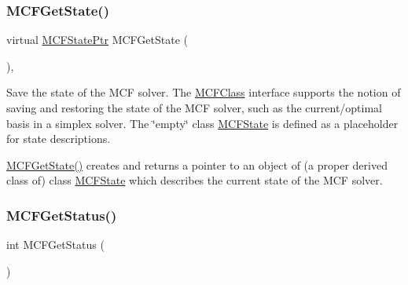 \mbox{\label{class_m_c_f_class_a995a05ecaa6ece4be3afbddbb36b2c4e}} 
\subsubsection{\texorpdfstring{M\+C\+F\+Get\+State()}{MCFGetState()}}
{\footnotesize\ttfamily virtual \mbox{\hyperlink{class_m_c_f_class_ab547218814e3b90d15f219f5aaf8b937}{M\+C\+F\+State\+Ptr}} M\+C\+F\+Get\+State (\begin{DoxyParamCaption}\item[{void}]{ }\end{DoxyParamCaption})\hspace{0.3cm}{\ttfamily [inline]}, {\ttfamily [virtual]}}

Save the state of the M\+CF solver. The \mbox{\hyperlink{class_m_c_f_class}{M\+C\+F\+Class}} interface supports the notion of saving and restoring the state of the M\+CF solver, such as the current/optimal basis in a simplex solver. The \char`\"{}empty\char`\"{} class \mbox{\hyperlink{class_m_c_f_class_1_1_m_c_f_state}{M\+C\+F\+State}} is defined as a placeholder for state descriptions.

\mbox{\hyperlink{class_m_c_f_class_a995a05ecaa6ece4be3afbddbb36b2c4e}{M\+C\+F\+Get\+State()}} creates and returns a pointer to an object of (a proper derived class of) class \mbox{\hyperlink{class_m_c_f_class_1_1_m_c_f_state}{M\+C\+F\+State}} which describes the current state of the M\+CF solver. \mbox{\label{class_m_c_f_class_a333e27ad7a73779b096cb70829cbe8be}} 
\subsubsection{\texorpdfstring{M\+C\+F\+Get\+Status()}{MCFGetStatus()}}
{\footnotesize\ttfamily int M\+C\+F\+Get\+Status (\begin{DoxyParamCaption}\item[{void}]{ }\end{DoxyParamCaption})\hspace{0.3cm}{\ttfamily [inline]}}

